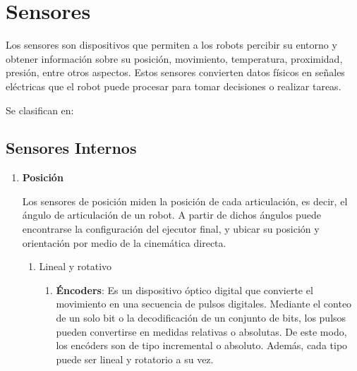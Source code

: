  \section{Sensores}
	Los sensores son dispositivos que permiten a los robots percibir su entorno y obtener información sobre su posición, movimiento, temperatura, proximidad, presión, entre otros aspectos. Estos sensores convierten datos físicos en señales eléctricas que el robot puede procesar para tomar decisiones o realizar tareas.

Se clasifican en:

	\subsection{Sensores Internos}
		\begin{enumerate}
			\item \textbf{Posición}
			
			Los sensores de posición miden la posición de cada articulación, es decir, el ángulo de articulación de un robot. A partir de dichos ángulos puede encontrarse la configuración del ejecutor final, y ubicar su posición y orientación por medio de la cinemática directa.\cite{saha2010robotics}\\
			
			
			\begin{enumerate}
				\item Lineal y rotativo
				\begin{enumerate}
					\item \textbf {Éncoders}: Es un dispositivo óptico digital que convierte el movimiento en una secuencia de pulsos digitales. Mediante el conteo de un solo bit o la decodificación de un conjunto de bits, los pulsos pueden convertirse en medidas relativas o absolutas. De este modo, los encóders son de tipo incremental o absoluto. Además, cada tipo puede ser lineal y rotatorio a su vez.\cite{saha2010robotics}\\
			

\end{enumerate}
\end{enumerate}
\end{enumerate}
